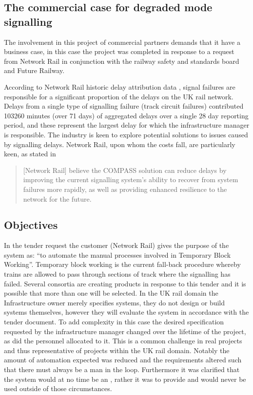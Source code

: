 \subsection{The commercial case for degraded mode signalling}
The involvement in this project of commercial partners demands that it have a business case, in this case the project was completed in response to a request from Network Rail in conjunction with the railway safety and standards board and Future Railway. 

According to Network Rail historic delay attribution data  \citep{NetworkRailInfrastructureLtd2017}, signal failures are responsible for a significant proportion of the delays on the UK rail network. Delays from a single type of signalling failure (track circuit failures) contributed 103260 minutes (over 71 days) of aggregated delays over a single 28 day reporting period, and these represent the largest delay for which the infrastructure manager is responsible. The industry is keen to explore potential solutions to issues caused by signalling delays. Network Rail, upon whom the costs fall, are particularly keen, as stated in \citet{MagazineRailTechnology2015} 
\begin{quote}
    [Network Rail] believe the COMPASS solution can reduce delays by improving the current signalling system’s ability to recover from system failures more rapidly, as well as providing enhanced resilience to the network for the future. 
\end{quote}

\subsection{Objectives}
In the tender request the customer (Network Rail) gives the purpose of the system as: ``to automate the manual processes involved in Temporary Block Working''. Temporary block working is the current fall-back procedure whereby trains are allowed to pass through sections of track where the signalling has failed. Several consortia are creating products in response to this tender and it is possible that more than one will be selected. In the UK rail domain the Infrastructure owner merely specifies systems, they do not design or build systems themselves, however they will evaluate the system in accordance with the tender document. To add complexity in this case the desired specification requested by the infrastructure manager changed over the lifetime of the project, as did the personnel allocated to it. This is a common challenge in real projects and thus representative of projects within the UK rail domain. Notably the amount of automation expected was reduced and the requirements altered such that there must always be a man in the loop. Furthermore it was clarified that the system would at no time be an , rather it was to provide  and would never be used outside of those circumstances. 

